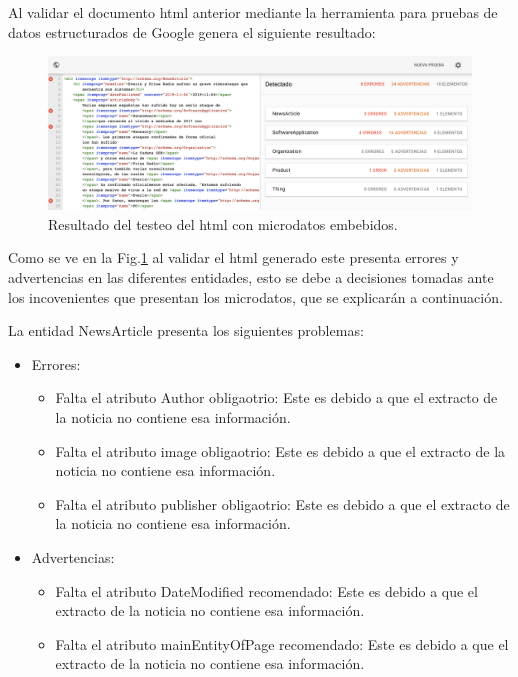 \documentclass[spanish]{llncs}   %
\begin{document}
Al validar el documento html anterior mediante la herramienta para pruebas de datos estructurados de Google 
genera el siguiente resultado:
\begin{figure}[h]
\centering
    \includegraphics[width=\textwidth]{resources/testMicroData.png}
    \caption{Resultado del testeo del html con microdatos embebidos.}
    \label{Fig.1}
\end{figure}

Como se ve en la Fig.\ref{Fig.1} al validar el html generado este presenta errores y advertencias en las 
diferentes entidades, esto se debe a decisiones tomadas ante los incovenientes que presentan los microdatos, 
que se explicarán a continuación.

La entidad NewsArticle presenta los siguientes problemas:

\begin{itemize}
    \item Errores:
    \begin{itemize}
        \item Falta el atributo Author obligaotrio: Este es debido a que el extracto de la noticia no contiene esa información.
        \item Falta el atributo image obligaotrio: Este es debido a que el extracto de la noticia no contiene esa información.
        \item Falta el atributo publisher obligaotrio: Este es debido a que el extracto de la noticia no contiene esa información.
    \end{itemize}
    \item Advertencias:
    \begin{itemize}
        \item Falta el atributo DateModified recomendado: Este es debido a que el extracto de la noticia no contiene esa información.
        \item Falta el atributo mainEntityOfPage recomendado: Este es debido a que el extracto de la noticia no contiene esa información.
    \end{itemize}
\end{itemize}
\end{document}
